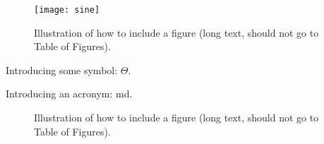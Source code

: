 \begin{figure}[th!]
  \centering
  \medskip
  \texttt{[image: sine]}
  \caption[Short caption for Table of Figures]{Illustration of how to
  include a figure (long text, should not go to Table of Figures).}
  \label{fig:sine}
\end{figure}

Introducing some symbol: $\Theta$.

Introducing an acronym: \gls{md}.

\begin{figure}[th!]
  \centering
  
  \caption[Short caption for Table of Figures]{Illustration of how to
  include a figure (long text, should not go to Table of Figures).}
  \label{fig:test}
\end{figure}

\cleardoublepage


